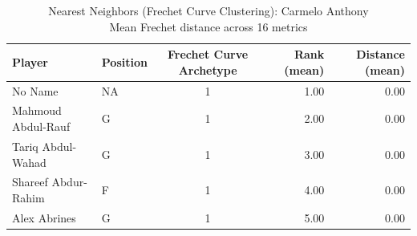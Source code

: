 \begin{table}[t]
\caption*{
{\fontsize{20}{25} Nearest Neighbors (Frechet Curve Clustering): Carmelo Anthony\fontsize{12}{15}\selectfont } \\ 
{\fontsize{14}{17}\selectfont  Mean Frechet distance across 16 metrics\fontsize{12}{15}\selectfont }
} 
\fontsize{12.0pt}{14.0pt}\selectfont
\begin{tabular*}{\linewidth}{@{\extracolsep{\fill}}llcrr}
\toprule
Player & Position & Frechet Curve Archetype & Rank (mean) & Distance (mean) \\ 
\midrule\addlinespace[2.5pt]
No Name & NA & 1 & 1.00 & 0.00 \\ 
Mahmoud Abdul-Rauf & G & 1 & 2.00 & 0.00 \\ 
Tariq Abdul-Wahad & G & 1 & 3.00 & 0.00 \\ 
Shareef Abdur-Rahim & F & 1 & 4.00 & 0.00 \\ 
Alex Abrines & G & 1 & 5.00 & 0.00 \\ 
\bottomrule
\end{tabular*}
\end{table}

